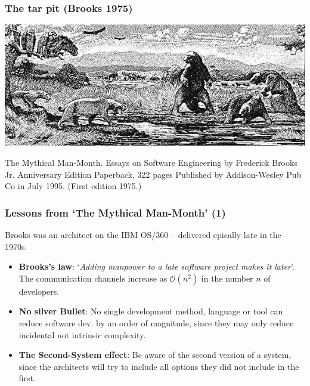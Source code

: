 \documentclass{beamer} %
\newcommand\emc[1]{\textcolor{midred}{\textbf{#1}}}
\begin{document}
\begin{frame}
\frametitle{The tar pit (Brooks 1975)}

\begin{center}
\includegraphics[scale=0.5]{assets/tar-pit}
\end{center}

{\small The Mythical Man-Month. Essays on Software Engineering by Frederick Brooks Jr. Anniversary Edition  Paperback, 322 pages Published by Addison-Wesley Pub Co in July 1995. (First edition 1975.)}

\end{frame}

\begin{frame}
\frametitle{Lessons from `The Mythical Man-Month' (1)}

Brooks was an architect on the IBM OS/360 -- delivered epically late in the 1970s.
\begin{itemize}
  \item  \emc{Brooks's law}: `\emph{Adding manpower to a late software project makes it later}'. The communication channels increase as $\mathcal{O}(n^2)$ in the number $n$ of developers.
  \item \emc{No silver Bullet}: No single development method, language or tool can reduce software dev. by an order of magnitude, since they may only reduce incidental not intrinsic complexity.
  \item \emc{The Second-System effect}: Be aware of the second version of a system, since the architects will try to include all options they did not include in the first.
\end{itemize}

\end{frame}
\end{document}
